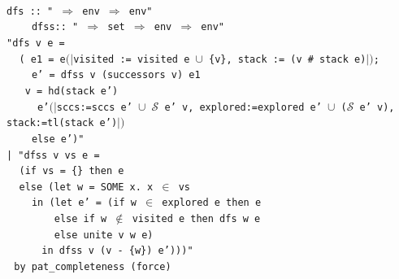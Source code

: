 \documentclass[a4 paper, 12pt]{article}
\newcommand{\where}{{\color{isa_green}{where}}}
\renewcommand{\and}{{\color{isa_green}{and}}}
\newcommand{\generic}[1]{{\color{isa_purple}{\textquotesingle#1}}}
\newcommand{\isa}[1]{\small\texttt{\\\noindent#1}}
\newcommand{\bblue}[1]{{\color{isa_blue}{#1}}}
\newcommand{\env}[1]{$(\!|$#1$|\!)$}
\theoremstyle{definition}
\begin{document}
\isa{
    {\color{isa_blue}{function}} dfs :: "\generic{v} $\Rightarrow$ \generic{v} env $\Rightarrow$ \generic{v} env" \and{}\\
    $~~~~~~~~~~$dfss:: "\generic{v} $\Rightarrow$ \generic{v} set $\Rightarrow$ \generic{v} env $\Rightarrow$ \generic{v} env" \where\\
    "{\color{isa_dark_blue}dfs} {\color{isa_dark_green}v e} =\\
    $~~~~~$({\color{isa_blue}{let}} {\color{isa_dark_green}e1} = {\color{isa_dark_green}e}\env{visited := visited e $\cup$ \{{\color{isa_dark_green}v}\}, stack := ({\color{isa_dark_green}v} \# stack {\color{isa_dark_green}e})};\\
    $~~~~~~~~~~${\color{isa_dark_green}e'} = {\color{isa_dark_blue}dfss} {\color{isa_dark_green}v} (successors {\color{isa_dark_green}v}) {\color{isa_dark_green}e1}\\
    $~~~~~${\color{isa_blue}{in if}} {\color{isa_dark_green}v} = hd(stack {\color{isa_dark_green}e'})\\
    $~~~~~~~~~~${\color{isa_blue}{then}} {\color{isa_dark_green}e'}\env{sccs:=sccs {\color{isa_dark_green}e'} $\cup$ {$\mathcal{S}$ {\color{isa_dark_green}e' v}}, explored:=explored {\color{isa_dark_green}e'} $\cup$ ($\mathcal{S}$ {\color{isa_dark_green}e' v}), stack:=tl(stack {\color{isa_dark_green}e'})}\\
    $~~~~~~~~~~${\color{isa_blue}else} {\color{isa_dark_green}e'})"\\
    | "{\color{isa_dark_blue}dfss} {\color{isa_dark_green}v vs e} =\\
    $~~~~~$({\color{isa_blue}if} {\color{isa_dark_green}vs} = \{\} {\color{isa_blue}then} {\color{isa_dark_green}e}\\
    $~~~~~${\color{isa_blue}else} ({\color{isa_blue}let} {\color{isa_dark_green}w} = SOME {\color{isa_dark_green}x}. {\color{isa_dark_green}x} $\in$ {\color{isa_dark_green}vs}\\
    $~~~~~~~~~~${\color{isa_blue}in} ({\color{isa_blue}let} {\color{isa_dark_green}e'} = ({\color{isa_blue}if} {\color{isa_dark_green}w} $\in$ explored {\color{isa_dark_green}e} {\color{isa_blue}then} {\color{isa_dark_green}e}\\
    $~~~~~~~~~~~~~~~~~~~${\color{isa_blue}else if} {\color{isa_dark_green}w} $\notin$ visited {\color{isa_dark_green}e} {\color{isa_blue}then} {\color{isa_dark_blue}dfs} {\color{isa_dark_green}w e}\\
    $~~~~~~~~~~~~~~~~~~~${\color{isa_blue}else} unite {\color{isa_dark_green}v w e})\\
    $~~~~~~~~~~~~~~${\color{isa_blue}in} {\color{isa_dark_blue}dfss} {\color{isa_dark_green}v} ({\color{isa_dark_green}v} - \{{\color{isa_dark_green}w}\}) {\color{isa_dark_green}e'})))"\\
    $~~~${\color{isa_blue}by} pat\_completeness (force\bblue{+})\\
}
\end{document}
